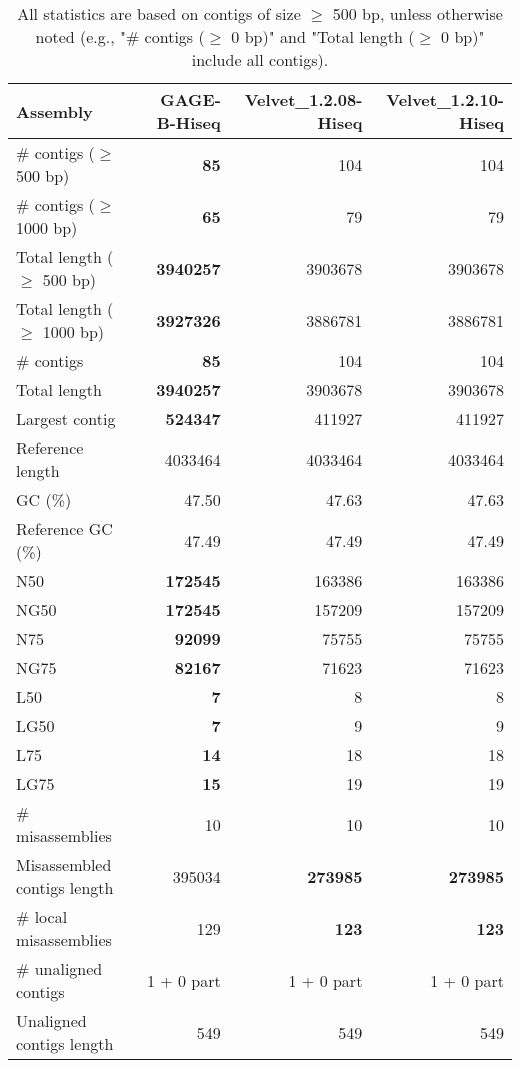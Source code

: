 \documentclass[12pt,a4paper]{article}
\begin{document}
\begin{table}[ht]
\begin{center}
\caption{All statistics are based on contigs of size $\geq$ 500 bp, unless otherwise noted (e.g., "\# contigs ($\geq$ 0 bp)" and "Total length ($\geq$ 0 bp)" include all contigs).}
\begin{tabular}{|l*{3}{|r}|}
\hline
Assembly & GAGE-B-Hiseq & Velvet\_1.2.08-Hiseq & Velvet\_1.2.10-Hiseq \\ \hline
\# contigs ($\geq$ 500 bp) & {\bf 85} & 104 & 104 \\ \hline
\# contigs ($\geq$ 1000 bp) & {\bf 65} & 79 & 79 \\ \hline
Total length ($\geq$ 500 bp) & {\bf 3940257} & 3903678 & 3903678 \\ \hline
Total length ($\geq$ 1000 bp) & {\bf 3927326} & 3886781 & 3886781 \\ \hline
\# contigs & {\bf 85} & 104 & 104 \\ \hline
Total length & {\bf 3940257} & 3903678 & 3903678 \\ \hline
Largest contig & {\bf 524347} & 411927 & 411927 \\ \hline
Reference length & 4033464 & 4033464 & 4033464 \\ \hline
GC (\%) & 47.50 & 47.63 & 47.63 \\ \hline
Reference GC (\%) & 47.49 & 47.49 & 47.49 \\ \hline
N50 & {\bf 172545} & 163386 & 163386 \\ \hline
NG50 & {\bf 172545} & 157209 & 157209 \\ \hline
N75 & {\bf 92099} & 75755 & 75755 \\ \hline
NG75 & {\bf 82167} & 71623 & 71623 \\ \hline
L50 & {\bf 7} & 8 & 8 \\ \hline
LG50 & {\bf 7} & 9 & 9 \\ \hline
L75 & {\bf 14} & 18 & 18 \\ \hline
LG75 & {\bf 15} & 19 & 19 \\ \hline
\# misassemblies & 10 & 10 & 10 \\ \hline
Misassembled contigs length & 395034 & {\bf 273985} & {\bf 273985} \\ \hline
\# local misassemblies & 129 & {\bf 123} & {\bf 123} \\ \hline
\# unaligned contigs & 1 + 0 part & 1 + 0 part & 1 + 0 part \\ \hline
Unaligned contigs length & 549 & 549 & 549 \\ \hline

\end{tabular}
\end{center}
\end{table}
\end{document}
